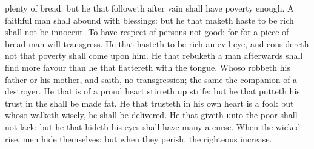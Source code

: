 {plenty of
bread: but he that
followeth after
vain
{} shall have poverty
enough.
A
faithful
man shall
abound with
blessings: but he that maketh
haste to be
rich shall not be
innocent.
To have
respect of
persons
{} not
good: for for a
piece of
bread
{}
man will
transgress.
He that
hasteth to be
rich
{} an
evil
eye, and
considereth not that
poverty shall
come upon him.
He that
rebuketh a
man
afterwards shall
find more
favour than he that
flattereth with the
tongue.
Whoso
robbeth his
father or his
mother, and
saith,
{} no
transgression; the same
{} the
companion of a
destroyer.
He that is of a
proud
heart stirreth
up
strife: but he that putteth his
trust in the
{} shall be made
fat.
He that
trusteth in his own
heart is a
fool: but whoso
walketh
wisely, he shall be
delivered.
He that
giveth unto the
poor shall not
lack: but he that
hideth his
eyes shall have
many a
curse.
When the
wicked
rise,
men
hide themselves: but when they
perish, the
righteous
increase.

}
